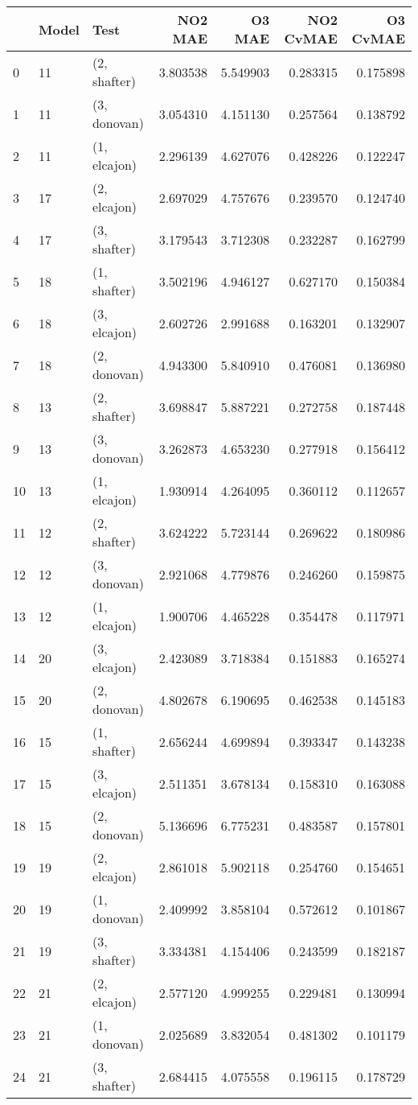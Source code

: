 \begin{tabular}{lllrrrr}
\toprule
{} & Model &          Test &   NO2 MAE &    O3 MAE &  NO2 CvMAE &  O3 CvMAE \\
\midrule
0  &    11 &  (2, shafter) &  3.803538 &  5.549903 &   0.283315 &  0.175898 \\
1  &    11 &  (3, donovan) &  3.054310 &  4.151130 &   0.257564 &  0.138792 \\
2  &    11 &  (1, elcajon) &  2.296139 &  4.627076 &   0.428226 &  0.122247 \\
3  &    17 &  (2, elcajon) &  2.697029 &  4.757676 &   0.239570 &  0.124740 \\
4  &    17 &  (3, shafter) &  3.179543 &  3.712308 &   0.232287 &  0.162799 \\
5  &    18 &  (1, shafter) &  3.502196 &  4.946127 &   0.627170 &  0.150384 \\
6  &    18 &  (3, elcajon) &  2.602726 &  2.991688 &   0.163201 &  0.132907 \\
7  &    18 &  (2, donovan) &  4.943300 &  5.840910 &   0.476081 &  0.136980 \\
8  &    13 &  (2, shafter) &  3.698847 &  5.887221 &   0.272758 &  0.187448 \\
9  &    13 &  (3, donovan) &  3.262873 &  4.653230 &   0.277918 &  0.156412 \\
10 &    13 &  (1, elcajon) &  1.930914 &  4.264095 &   0.360112 &  0.112657 \\
11 &    12 &  (2, shafter) &  3.624222 &  5.723144 &   0.269622 &  0.180986 \\
12 &    12 &  (3, donovan) &  2.921068 &  4.779876 &   0.246260 &  0.159875 \\
13 &    12 &  (1, elcajon) &  1.900706 &  4.465228 &   0.354478 &  0.117971 \\
14 &    20 &  (3, elcajon) &  2.423089 &  3.718384 &   0.151883 &  0.165274 \\
15 &    20 &  (2, donovan) &  4.802678 &  6.190695 &   0.462538 &  0.145183 \\
16 &    15 &  (1, shafter) &  2.656244 &  4.699894 &   0.393347 &  0.143238 \\
17 &    15 &  (3, elcajon) &  2.511351 &  3.678134 &   0.158310 &  0.163088 \\
18 &    15 &  (2, donovan) &  5.136696 &  6.775231 &   0.483587 &  0.157801 \\
19 &    19 &  (2, elcajon) &  2.861018 &  5.902118 &   0.254760 &  0.154651 \\
20 &    19 &  (1, donovan) &  2.409992 &  3.858104 &   0.572612 &  0.101867 \\
21 &    19 &  (3, shafter) &  3.334381 &  4.154406 &   0.243599 &  0.182187 \\
22 &    21 &  (2, elcajon) &  2.577120 &  4.999255 &   0.229481 &  0.130994 \\
23 &    21 &  (1, donovan) &  2.025689 &  3.832054 &   0.481302 &  0.101179 \\
24 &    21 &  (3, shafter) &  2.684415 &  4.075558 &   0.196115 &  0.178729 \\
\bottomrule
\end{tabular}
